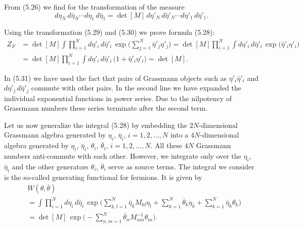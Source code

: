 From (5.26) we find for the transformation of the measure
\begin{equation}
  d\eta_N\,d\bar{\eta}_N\cdots d\eta_1\,d\bar{\eta}_1
  = \det[M]\,d\eta'_N\,d\bar{\eta}'_N\cdots d\eta'_1\,d\bar{\eta}'_1 .
\end{equation}

Using the transformation (5.29) and (5.30) we prove formula (5.28):
\begin{equation}
  \begin{aligned}
    Z_F &= \det[M]\int\prod_{i=1}^{N}d\eta'_i\,d\bar{\eta}'_i\,
      \exp\Big(\sum_{j=1}^{N}\bar{\eta}'_j\eta'_j\Big)
      = \det[M]\prod_{i=1}^{N}\int d\eta'_i\,d\bar{\eta}'_i\,
      \exp\big(\bar{\eta}'_i\eta'_i\big)\\
      &= \det[M]\prod_{i=1}^{N}\int d\eta'_i\,d\bar{\eta}'_i\,
      \big(1 + \bar{\eta}'_i\eta'_i\big)
      = \det[M] .
  \end{aligned}
\end{equation}

In (5.31) we have used the fact that pairs of Grassmann objects such as $\eta'_i\bar{\eta}'_i$
and $d\eta'_j\,d\bar{\eta}'_j$ commute with other pairs. In the second line we have expanded
the individual exponential functions in power series. Due to the nilpotency of
Grassmann numbers these series terminate after the second term.

Let us now generalize the integral (5.28) by embedding the $2N$-dimensional
Grassmann algebra generated by $\eta_i$, $\bar{\eta}_i$, $i = 1, 2, \ldots, N$ into a $4N$-dimensional
algebra generated by $\eta_i$, $\bar{\eta}_i$, $\theta_i$, $\bar{\theta}_i$, $i = 1, 2, \ldots, N$. All these $4N$ Grassmann
numbers anti-commute with each other. However, we integrate only over the
$\eta_i$, $\bar{\eta}_i$ and the other generators $\theta_i$, $\bar{\theta}_i$ serve as source terms. The integral we
consider is the so-called generating functional for fermions. It is given by
\begin{equation}
  \begin{aligned}
    &W(\theta,\bar{\theta})\\
    &= \int\prod_{i=1}^{N}d\eta_i\,d\bar{\eta}_i\,
      \exp\Big(\sum_{k,l=1}^{N}\bar{\eta}_k M_{kl}\eta_l
      + \sum_{k=1}^{N}\bar{\theta}_k\eta_k
      + \sum_{k=1}^{N}\bar{\eta}_k\theta_k\Big)\\
    &= \det[M]\,\exp\Big(-\sum_{n,m=1}^{N}\bar{\theta}_n M^{-1}_{nm}\theta_m\Big) .
  \end{aligned}
\end{equation}

